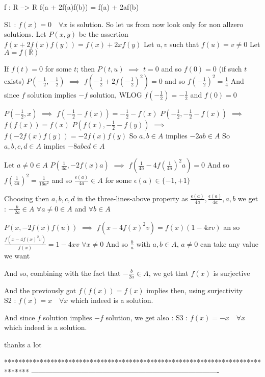 \begin{solution}
	\begin{tcolorbox}f : R --> R
f(a + 2f(a)f(b)) = f(a) + 2af(b)\end{tcolorbox}
$\boxed{\text{S1 : }f(x)=0\quad\forall x}$ is  solution. So let us from now look only for non allzero solutions.
Let $P(x,y)$ be the assertion $f(x+2f(x)f(y))=f(x)+2xf(y)$
Let $u,v$ such that $f(u)=v\ne 0$
Let $A=f(\mathbb R)$

If $f(t)=0$ for some $t$; then $P(t,u)$ $\implies$ $t=0$ and so $f(0)=0$ (if such $t$ exists)
$P(-\frac 12,-\frac 12)$ $\implies$ $f(-\frac 12+2f(-\frac 12)^2)=0$ and so $f(-\frac 12)^2=\frac 14$
And since $f$ solution implies $-f$ solution, WLOG $f(-\frac 12)=-\frac 12$ and $f(0)=0$

$P(-\frac 12,x)$ $\implies$ $f(-\frac 12-f(x))=-\frac 12-f(x)$
$P(-\frac 12, -\frac 12-f(x))$ $\implies$ $f(f(x))=f(x)$
$P(f(x),-\frac 12-f(y))$ $\implies$ $f(-2f(x)f(y))=-2f(x)f(y)$
So $a,b\in A$ implies $-2ab\in A$
So $a,b,c,d\in A$ implies $-8abcd\in A$

Let $a\ne 0\in A$
$P(\frac 1{4a},-2f(x)a)$ $\implies$ $f(\frac 1{4a}-4f(\frac 1{4a})^2a)=0$
And so $f(\frac 1{4a})^2=\frac 1{16a^2}$ and so $\frac{\epsilon(a)}{4a}\in A$ for some $\epsilon(a)\in\{-1,+1\}$

Choosing then $a,b,c,d$ in the three-lines-above property as $\frac{\epsilon(a)}{4a},\frac{\epsilon(a)}{4a},a,b$ we get :
$-\frac{b}{2a}\in A$ $\forall a\ne 0\in A$ and $\forall b\in A$

$P(x,-2f(x)f(u))$ $\implies$ $f(x-4f(x)^2v)=f(x)(1-4xv)$ an so
$\frac{f(x-4f(x)^2v)}{f(x)}=1-4xv$ $\forall x\ne 0$
And so $\frac ba$ with $a,b\in A$, $a\ne 0$ can take any value we want

And so, combining with the fact that $-\frac{b}{2a}\in A$, we get that $f(x)$ is surjective

And the previously got $f(f(x))=f(x)$ implies then, using surjectivity
$\boxed{\text{S2 : }f(x)=x\quad\forall x}$ which indeed is a solution.

And since $f$ solution implies $-f$ solution, we get also :
$\boxed{\text{S3 : }f(x)=-x\quad\forall x}$ which indeed is a solution.




\end{solution}



\begin{solution}
	thanks a lot
\end{solution}
*******************************************************************************
-------------------------------------------------------------------------------

